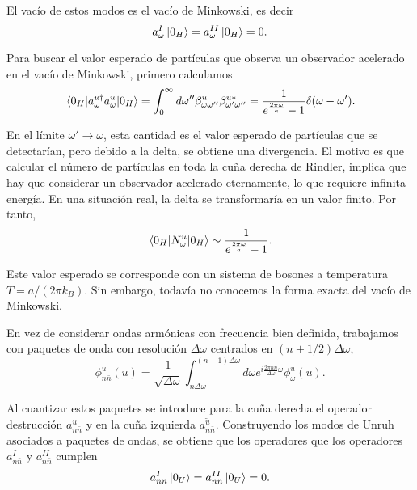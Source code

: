 El vacío de estos modos es el vacío de Minkowski, es decir
\begin{equation}
  a_\omega^I \ket{0_H} = a_\omega^{II}\ket{0_H} = 0.
\end{equation}
 
Para buscar el valor esperado de partículas que observa un observador acelerado
en el vacío de Minkowski, primero calculamos
\begin{equation}
  \ev{a_\omega^{u\dagger}a_\omega^u}{0_H} = \int_0^\infty d\omega'' \beta_{\omega\omega''}^u
  \beta_{\omega'\omega''}^{u*} = \frac{1}{e^{\frac{2\pi\omega}{a}}-1}\delta(\omega-\omega').
\end{equation}

En el límite $\omega'\to\omega$, esta cantidad es el valor esperado de partículas que se
detectarían, pero debido a la delta, se obtiene una divergencia.
El motivo es que calcular el número de partículas en toda la cuña derecha de Rindler, 
implica que hay que considerar un observador acelerado eternamente, lo que requiere infinita
energía.
En una situación real, la delta se transformaría en un valor finito.
Por tanto,
\begin{equation}
  \ev{N_\omega^u}{0_H} \sim \frac{1}{e^{\frac{2\pi\omega}{a}}-1}.
\end{equation}

Este valor esperado se corresponde con un sistema de bosones a temperatura $T=a/(2\pi k_B)$.
Sin embargo, todavía no conocemos la forma exacta del vacío de Minkowski.

En vez de considerar ondas armónicas con frecuencia bien definida, trabajamos con paquetes
de onda con resolución $\Delta \omega$ centrados en $(n+1/2)\Delta \omega$,
\begin{equation}
  \phi_{n\bar n}^u(u)=\frac{1}{\sqrt{\Delta \omega}}\int_{n\Delta\omega}^{(n+1)\Delta \omega}d\omega e^{i\frac{2\pi \bar n n}{\Delta \omega}\omega}
  \phi^u_\omega(u).
\end{equation}

Al cuantizar estos paquetes se introduce para la cuña derecha el operador destrucción $a_{n\bar n}^u$
y en la cuña izquierda $a_{n\bar n}^{\tilde u}$. 
Construyendo los modos de Unruh asociados a paquetes de ondas, se obtiene que
los operadores que los operadores $a_{n\bar n}^I$ y $a_{n\bar n}^{II}$ cumplen
\begin{equation}
  a_{n\bar n}^I\ket{0_U} = a_{n\bar n}^{II} \ket{0_U} = 0.
\end{equation}

